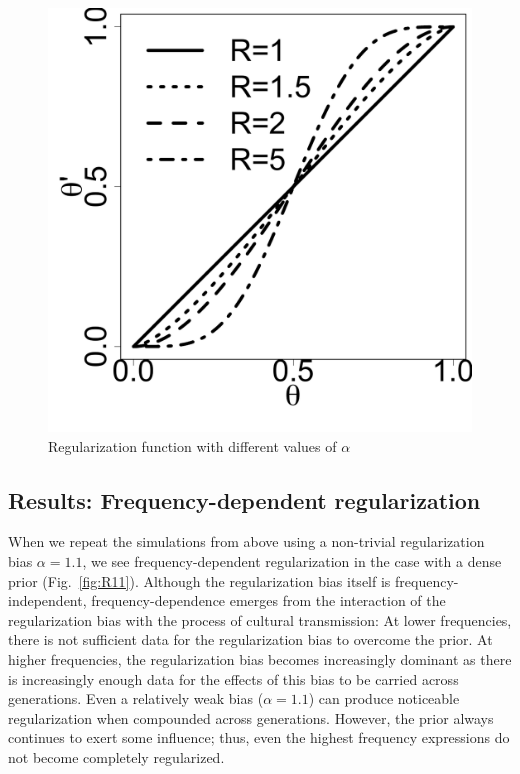 \documentclass{evolang11}
\begin{document}
 \begin{figure}
\vspace{-1cm}
\begin{center}
\includegraphics[scale=.2]{R.pdf}
\end{center}
\vspace{-0.5cm}
\caption{{\footnotesize Regularization function with different values of $\alpha$ \label{fig:R}}}
\vspace{-0.5cm}
\end{figure}

 \subsection{Results: Frequency-dependent regularization}
 When we repeat the simulations from above using  a non-trivial regularization bias $\alpha=1.1$, we see frequency-dependent regularization in the case with a dense prior (Fig.\ \ref{fig:R11}). Although the regularization bias itself is frequency-independent, frequency-dependence emerges from the interaction of the regularization bias with the process of cultural transmission: At lower frequencies, there is not sufficient data for the regularization bias to overcome the prior. At higher frequencies, the regularization bias becomes increasingly dominant as there is increasingly enough data for the effects of this bias to be carried across generations. Even a relatively weak bias ($\alpha=1.1$) can produce noticeable regularization when compounded across generations. However, the prior always continues to exert some influence; thus, even the highest frequency expressions do not become completely regularized.
 
\end{document}
